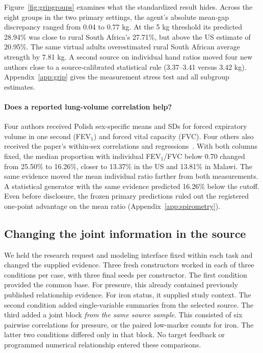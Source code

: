 \documentclass[sigconf,anonymous,review]{acmart}
\begin{document}
Figure~\ref{fig:gripgroups} examines what the standardized result hides. Across the eight groups in the two primary settings, the agent's absolute mean-gap discrepancy ranged from 0.04 to 0.77 kg. At the 5 kg threshold its predicted 28.94\% was close to rural South Africa's 27.71\%, but above the US estimate of 20.95\%. The same virtual adults overestimated rural South African average strength by 7.81 kg. A second source on individual hand ratios moved four new authors close to a source-calibrated statistical rule (3.37--3.41 versus 3.42 kg). Appendix~\ref{app:grip} gives the measurement stress test and all subgroup estimates.

\paragraph{Does a reported lung-volume correlation help?}
Four authors received Polish sex-specific means and SDs for forced expiratory volume in one second (FEV$_1$) and forced vital capacity (FVC). Four others also received the paper's within-sex correlations and regressions~\cite{polishspi}. With both columns fixed, the median proportion with individual FEV$_1$/FVC below 0.70 changed from 25.50\% to 16.26\%, closer to 13.37\% in the US and 13.81\% in Malawi. The same evidence moved the mean individual ratio farther from both measurements. A statistical generator with the same evidence predicted 16.26\% below the cutoff. Even before disclosure, the frozen primary predictions ruled out the registered one-point advantage on the mean ratio (Appendix~\ref{app:spirometry}).

\subsection{Changing the joint information in the source}
\label{sec:controlled}
We held the research request and modeling interface fixed within each task and changed the supplied evidence. Three fresh constructors worked in each of three conditions per case, with three final seeds per constructor. The first condition provided the common base. For pressure, this already contained previously published relationship evidence. For iron status, it supplied study context. The second condition added single-variable summaries from the selected source. The third added a joint block \emph{from the same source sample}. This consisted of six pairwise correlations for pressure, or the paired low-marker counts for iron. The latter two conditions differed only in that block. No target feedback or programmed numerical relationship entered these comparisons.
\end{document}
